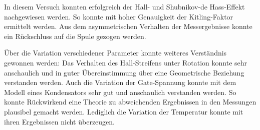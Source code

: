 
In diesem Versuch konnten erfolgreich der Hall- und Shubnikov-de Hass-Effekt nachgewiesen werden. So konnte mit hoher Genauigkeit der Kitling-Faktor ermittelt werden. Aus dem asymmetrischen Verhalten der Messergebnisse konnte ein Rückschluss auf die Spule gezogen werden.

Über die Variation verschiedener Parameter konnte weiteres Verständnis gewonnen werden: Das Verhalten des Hall-Streifens unter Rotation konnte sehr anschaulich und in guter Übereinstimmung über eine Geometrische Beziehung verstanden werden. Auch die Variation der Gate-Spannung konnte mit dem Modell eines Kondensators sehr gut und anschaulich verstanden werden. So konnte Rückwirkend eine Theorie zu abweichenden Ergebnissen in den Messungen plausibel gemacht werden. Lediglich die Variation der Temperatur konnte mit ihren Ergebnissen nicht überzeugen.